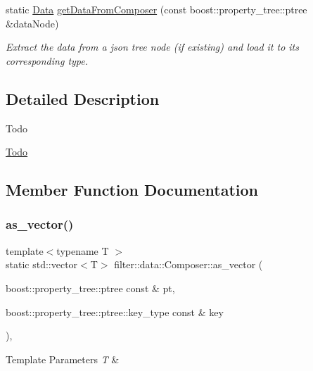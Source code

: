 \begin{DoxyCompactItemize}
static \hyperlink{classfilter_1_1data_1_1_data}{Data} \hyperlink{classfilter_1_1data_1_1_composer_a19c9dae95476fa0f3260a3fa25e49040}{get\+Data\+From\+Composer} (const boost\+::property\+\_\+tree\+::ptree \&data\+Node)
\begin{DoxyCompactList}\small\item\em Extract the data from a json tree node (if existing) and load it to its corresponding type. \end{DoxyCompactList}\end{DoxyCompactItemize}


\subsection{Detailed Description}
\begin{DoxyRefDesc}{Todo}
\item[\hyperlink{todo__todo000017}{Todo}]\end{DoxyRefDesc}


\subsection{Member Function Documentation}
\mbox{\label{classfilter_1_1data_1_1_composer_a18a6b0b2a11dad44847df3eefad292a1}} 
\subsubsection{\texorpdfstring{as\+\_\+vector()}{as\_vector()}}
{\footnotesize\ttfamily template$<$typename T $>$ \\
static std\+::vector$<$T$>$ filter\+::data\+::\+Composer\+::as\+\_\+vector (\begin{DoxyParamCaption}\item[{boost\+::property\+\_\+tree\+::ptree const \&}]{pt,  }\item[{boost\+::property\+\_\+tree\+::ptree\+::key\+\_\+type const \&}]{key }\end{DoxyParamCaption})\hspace{0.3cm}{\ttfamily [inline]}, {\ttfamily [static]}}


\begin{DoxyTemplParams}{Template Parameters}
{\em T} & \\
\hline
\end{DoxyTemplParams}

